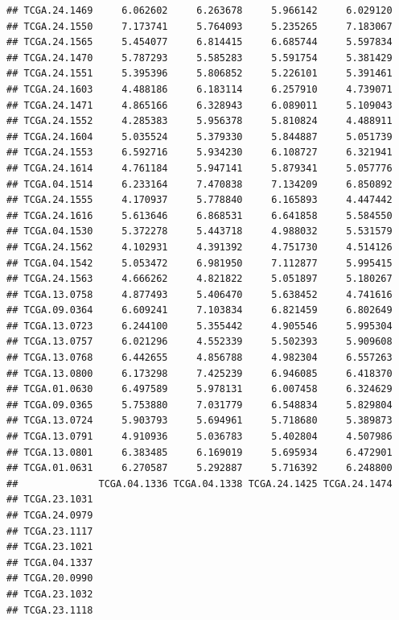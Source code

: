 \documentclass[UTF8]{beamer}\usepackage[]{graphicx}\usepackage[]{color}
\makeatletter
\newenvironment{kframe}{%
 \def\at@end@of@kframe{}%
 \ifinner\ifhmode%
  \def\at@end@of@kframe{\end{minipage}}%
  \begin{minipage}{\columnwidth}%
 \fi\fi%
 \def\FrameCommand##1{\hskip\@totalleftmargin \hskip-\fboxsep
 \colorbox{shadecolor}{##1}\hskip-\fboxsep
     \hskip-\linewidth \hskip-\@totalleftmargin \hskip\columnwidth}%
 \MakeFramed {\advance\hsize-\width
   \@totalleftmargin\z@ \linewidth\hsize
   \@setminipage}}%
 {\par\unskip\endMakeFramed%
 \at@end@of@kframe}
\newenvironment{knitrout}{}{} %
\makeatother
\begin{document}
\begin{frame}[fragile]
\begin{knitrout}
\begin{kframe}
\begin{verbatim}
## TCGA.24.1469     6.062602     6.263678     5.966142     6.029120
## TCGA.24.1550     7.173741     5.764093     5.235265     7.183067
## TCGA.24.1565     5.454077     6.814415     6.685744     5.597834
## TCGA.24.1470     5.787293     5.585283     5.591754     5.381429
## TCGA.24.1551     5.395396     5.806852     5.226101     5.391461
## TCGA.24.1603     4.488186     6.183114     6.257910     4.739071
## TCGA.24.1471     4.865166     6.328943     6.089011     5.109043
## TCGA.24.1552     4.285383     5.956378     5.810824     4.488911
## TCGA.24.1604     5.035524     5.379330     5.844887     5.051739
## TCGA.24.1553     6.592716     5.934230     6.108727     6.321941
## TCGA.24.1614     4.761184     5.947141     5.879341     5.057776
## TCGA.04.1514     6.233164     7.470838     7.134209     6.850892
## TCGA.24.1555     4.170937     5.778840     6.165893     4.447442
## TCGA.24.1616     5.613646     6.868531     6.641858     5.584550
## TCGA.04.1530     5.372278     5.443718     4.988032     5.531579
## TCGA.24.1562     4.102931     4.391392     4.751730     4.514126
## TCGA.04.1542     5.053472     6.981950     7.112877     5.995415
## TCGA.24.1563     4.666262     4.821822     5.051897     5.180267
## TCGA.13.0758     4.877493     5.406470     5.638452     4.741616
## TCGA.09.0364     6.609241     7.103834     6.821459     6.802649
## TCGA.13.0723     6.244100     5.355442     4.905546     5.995304
## TCGA.13.0757     6.021296     4.552339     5.502393     5.909608
## TCGA.13.0768     6.442655     4.856788     4.982304     6.557263
## TCGA.13.0800     6.173298     7.425239     6.946085     6.418370
## TCGA.01.0630     6.497589     5.978131     6.007458     6.324629
## TCGA.09.0365     5.753880     7.031779     6.548834     5.829804
## TCGA.13.0724     5.903793     5.694961     5.718680     5.389873
## TCGA.13.0791     4.910936     5.036783     5.402804     4.507986
## TCGA.13.0801     6.383485     6.169019     5.695934     6.472901
## TCGA.01.0631     6.270587     5.292887     5.716392     6.248800
##              TCGA.04.1336 TCGA.04.1338 TCGA.24.1425 TCGA.24.1474
## TCGA.23.1031                                                    
## TCGA.24.0979                                                    
## TCGA.23.1117                                                    
## TCGA.23.1021                                                    
## TCGA.04.1337                                                    
## TCGA.20.0990                                                    
## TCGA.23.1032                                                    
## TCGA.23.1118                                                    

\end{verbatim}
\end{kframe}
\end{knitrout}
\end{frame}
\end{document}
